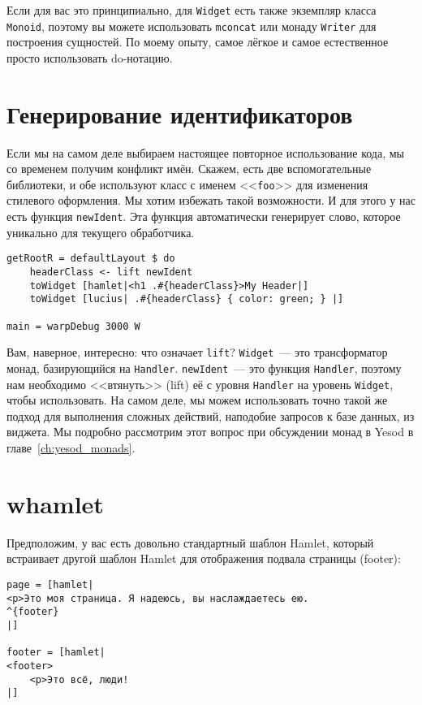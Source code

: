 \begin{remark}
    Если для вас это принципиально, для \lstinline'Widget' есть также экземпляр
    класса \lstinline'Monoid', поэтому вы можете использовать
    \lstinline'mconcat' или монаду \lstinline'Writer' для построения сущностей.
    По моему опыту, самое лёгкое и самое естественное просто использовать
    do-нотацию.
\end{remark}

\section{Генерирование идентификаторов}
Если мы на самом деле выбираем настоящее повторное использование кода, мы со
временем получим конфликт имён. Скажем, есть две вспомогательные библиотеки, и
обе используют класс с именем <<\lstinline'foo'>> для изменения стилевого
оформления. Мы хотим избежать такой возможности. И для этого у нас есть функция
\lstinline'newIdent'. Эта функция автоматически генерирует слово, которое
уникально для текущего обработчика.
\begin{lstlisting}[caption={Использование \lstinline'newIdent'}]
getRootR = defaultLayout $ do
    headerClass <- lift newIdent
    toWidget [hamlet|<h1 .#{headerClass}>My Header|]
    toWidget [lucius| .#{headerClass} { color: green; } |]

main = warpDebug 3000 W
\end{lstlisting}

\begin{remark}
    Вам, наверное, интересно: что означает \lstinline'lift'?
    \lstinline'Widget'~--- это трансформатор монад, базирующийся на
    \lstinline'Handler'. \lstinline'newIdent'~--- это функция
    \lstinline'Handler', поэтому нам необходимо <<втянуть>> (lift) её с уровня
    \lstinline'Handler' на уровень \lstinline'Widget', чтобы использовать. На
    самом деле, мы можем использовать точно такой же подход для выполнения
    сложных действий, наподобие запросов к базе данных, из виджета. Мы подробно
    рассмотрим этот вопрос при обсуждении монад в Yesod в
    главе~\ref{ch:yesod_monads}.
\end{remark}

\section{whamlet}
Предположим, у вас есть довольно стандартный шаблон Hamlet, который встраивает
другой шаблон Hamlet для отображения подвала страницы (footer):
\begin{lstlisting}
page = [hamlet|
<p>Это моя страница. Я надеюсь, вы наслаждаетесь ею.
^{footer}
|]

footer = [hamlet|
<footer>
    <p>Это всё, люди!
|]
\end{lstlisting}

